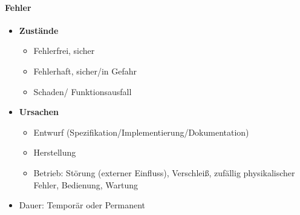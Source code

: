 	\paragraph{Fehler}
		\begin{itemize}
			\item \textbf{Zustände}
			\begin{itemize}
				\item Fehlerfrei, sicher
				\item Fehlerhaft, sicher/in Gefahr
				\item Schaden/ Funktionsausfall
			\end{itemize}
			\item \textbf{Ursachen}
			\begin{itemize}
				\item Entwurf (Spezifikation/Implementierung/Dokumentation)
				\item Herstellung
				\item Betrieb: Störung (externer Einfluss), Verschleiß, zufällig physikalischer Fehler, Bedienung,  Wartung
			\end{itemize}
			\item Dauer: Temporär oder Permanent
		\end{itemize}

